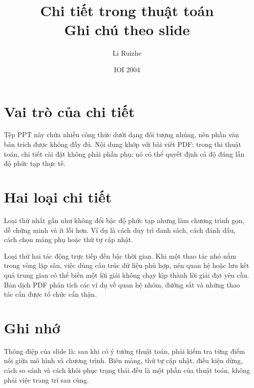 \documentclass[11pt]{article}
\title{Chi tiết trong thuật toán\\{\large Ghi chú theo slide}}
\author{Li Ruizhe}
\date{IOI 2004}
\begin{document}
\maketitle


\section{Vai trò của chi tiết}

Tệp PPT này chứa nhiều công thức dưới dạng đối tượng nhúng, nên phần văn bản
trích được không đầy đủ. Nội dung khớp với bài viết PDF: trong thi thuật
toán, chi tiết cài đặt không phải phần phụ; nó có thể quyết định cả độ đúng
lẫn độ phức tạp thực tế.

\section{Hai loại chi tiết}

Loại thứ nhất gần như không đổi bậc độ phức tạp nhưng làm chương trình gọn,
dễ chứng minh và ít lỗi hơn. Ví dụ là cách duy trì danh sách, cách đánh dấu,
cách chọn mảng phụ hoặc thứ tự cập nhật.

Loại thứ hai tác động trực tiếp đến bậc thời gian. Khi một thao tác nhỏ nằm
trong vòng lặp sâu, việc dùng cấu trúc dữ liệu phù hợp, nén quan hệ hoặc lưu
kết quả trung gian có thể biến một lời giải không chạy kịp thành lời giải
đạt yêu cầu. Bản dịch PDF phân tích các ví dụ về quan hệ nhóm, đường sắt và
những thao tác cần được tổ chức cẩn thận.

\section{Ghi nhớ}

Thông điệp của slide là: sau khi có ý tưởng thuật toán, phải kiểm tra từng
điểm nối giữa mô hình và chương trình. Biên mảng, thứ tự cập nhật, điều kiện
dừng, cách so sánh và cách khôi phục trạng thái đều là một phần của thuật
toán, không phải việc trang trí sau cùng.
\end{document}
